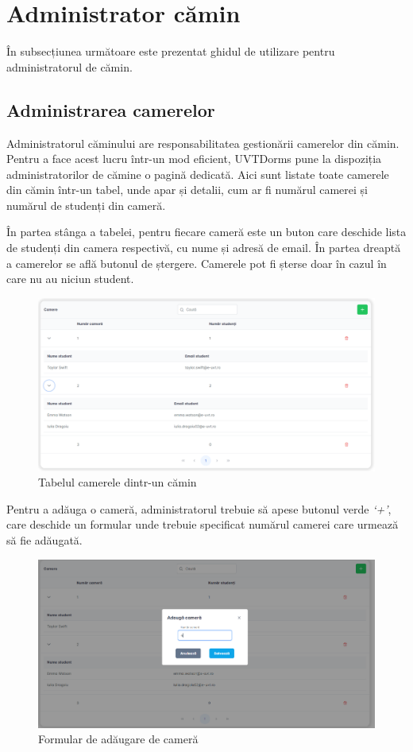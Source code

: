\documentclass[12pt,a4paper]{report}
\theoremstyle{definition}
\theoremstyle{remark}
\begin{document}
\section{Administrator cămin}
În subsecțiunea următoare este prezentat ghidul de utilizare pentru administratorul de cămin.
\subsection{Administrarea camerelor}

\par Administratorul căminului are responsabilitatea gestionării camerelor din cămin. Pentru a face acest lucru într-un mod eficient, UVTDorms pune la dispoziția administratorilor de cămine o pagină dedicată. Aici sunt listate toate camerele din cămin într-un tabel, unde apar și detalii, cum ar fi numărul camerei și numărul de studenți din cameră.

\par În partea stânga a tabelei, pentru fiecare cameră este un buton care deschide lista de studenți din camera respectivă, cu nume și adresă de email. În partea dreaptă a camerelor se află butonul de ștergere. Camerele pot fi șterse doar în cazul în care nu au niciun student.

\begin{figure}[H]
    \centering
    \includegraphics[width=0.8\linewidth]{resurse/ghid_utilizare/administrare_camere.png}
    \caption{Tabelul camerele dintr-un cămin}
\end{figure}

\par Pentru a adăuga o cameră, administratorul trebuie să apese butonul verde \textit{`+'}, care deschide un formular unde trebuie specificat numărul camerei care urmează să fie adăugată.


\begin{figure}[H]
    \centering
    \includegraphics[width=0.8\linewidth]{resurse/ghid_utilizare/adaugare_camera.png}
    \caption{Formular de adăugare de cameră}
\end{figure}
\end{document}
